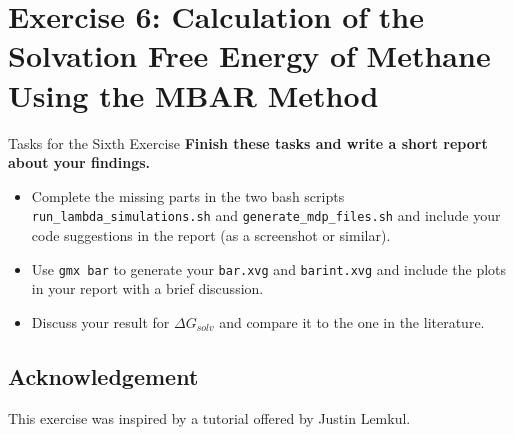 \documentclass[9pt,tutorial]{livecoms}
\newcommand{\code}[1]{\colorbox{light-gray}{\texttt{#1}}}
\begin{document}
\newpage

\section{Exercise 6: Calculation of the Solvation Free Energy of Methane Using the MBAR Method}\label{sec:freeEnerSolv}
\begin{Checklists}
    \begin{checklist}{Tasks for the Sixth Exercise}
    \textbf{Finish these tasks and write a short report about your findings.}
    \begin{itemize}
		\item Complete the missing parts in the two bash scripts \code{run\_lambda\_simulations.sh} and \code{generate\_mdp\_files.sh} and include your code suggestions in the report (as a screenshot or similar).
		\item Use \code{gmx bar} to generate your \code{bar.xvg} and \code{barint.xvg} and include the plots in your report with a brief discussion. 
		\item Discuss your result for $\Delta G_{solv}$ and compare it to the one in the literature.
	\end{itemize} 
    \end{checklist}
\end{Checklists}


\subsection*{Acknowledgement}
This exercise was inspired by a tutorial offered by Justin Lemkul.\cite{Lemkul2019}
\end{document}
